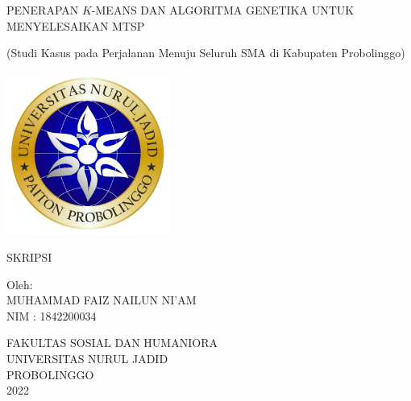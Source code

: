 \begin{titlepage}
   \begin{center}

       PENERAPAN $K$-MEANS DAN ALGORITMA GENETIKA UNTUK MENYELESAIKAN MTSP
       
       (Studi Kasus pada Perjalanan Menuju Seluruh SMA di Kabupaten Probolinggo)

       \vfill
       
       \includegraphics[width=0.4\textwidth]{logo.png}
       
       \vfill
       
       SKRIPSI
       
       \vfill
       
       Oleh:\\
       MUHAMMAD FAIZ NAILUN NI'AM\\
       NIM : 1842200034

       \vfill
       
       FAKULTAS SOSIAL DAN HUMANIORA\\       
       UNIVERSITAS NURUL JADID\\
       PROBOLINGGO\\
       2022
       
   \end{center}
\end{titlepage}
